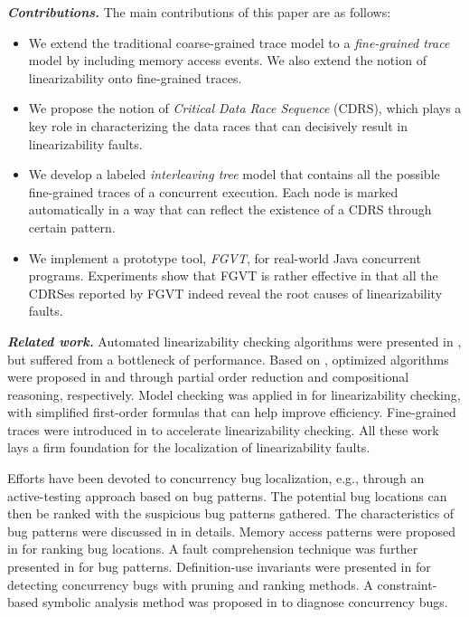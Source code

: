 \documentclass[runningheads]{llncs}
\begin{document}
\noindent\textbf{\textit{Contributions.}}
The main contributions of this paper are as follows:
\begin{itemize}
  \item We extend the traditional coarse-grained trace model to a \textit{fine-grained trace} model by including memory access events. We also extend the notion of linearizability onto fine-grained traces.
  \item We propose the notion of \textit{Critical Data Race Sequence} (CDRS), which plays a key role in characterizing the data races that can decisively result in linearizability faults.
  \item We develop a labeled \textit{interleaving tree} model that contains all the possible fine-grained traces of a concurrent execution. Each node is marked automatically in a way that can reflect the existence of a CDRS through certain pattern.
  \item We implement a prototype tool, \textit{FGVT}, for real-world Java concurrent programs. Experiments show that FGVT is rather effective in that all the CDRSes reported by FGVT indeed reveal the root causes of linearizability faults.
\end{itemize}

\noindent\textbf{\textit{Related work.}} Automated linearizability checking algorithms were presented in \cite{DBLP:conf/pldi/BurckhardtDMT10,DBLP:journals/jpdc/WingG93}, but suffered from a bottleneck of performance. Based on \cite{DBLP:journals/jpdc/WingG93}, optimized algorithms were proposed in \cite{DBLP:journals/concurrency/Lowe17} and \cite{DBLP:conf/forte/HornK15a} through partial order reduction and compositional reasoning, respectively. Model checking was applied in \cite{DBLP:conf/popl/BouajjaniEEH15,DBLP:conf/pldi/EmmiEH15} for linearizability checking, with simplified first-order formulas that can help improve efficiency. Fine-grained traces were introduced in \cite{DBLP:conf/sac/LongZ16} to accelerate linearizability checking. All these work lays a firm foundation for the localization of linearizability faults.

Efforts have been devoted to concurrency bug localization, e.g., through an active-testing approach based on bug patterns. The potential bug locations can then be ranked with the suspicious bug patterns gathered. The characteristics of bug patterns were discussed in \cite{DBLP:conf/asplos/LuPSZ08,DBLP:conf/ipps/FarchiNU03} in details. Memory access patterns were proposed in \cite{DBLP:conf/icse/ParkVH10,DBLP:conf/icst/ParkVH12,DBLP:conf/icsm/LiuQWM14} for ranking bug locations. A fault comprehension technique was further presented in \cite{DBLP:conf/icse/Park04} for bug patterns. Definition-use invariants were presented in \cite{DBLP:conf/oopsla/ShiPYLZCZ10} for detecting concurrency bugs with pruning and ranking methods. A constraint-based symbolic analysis method was proposed in \cite{DBLP:conf/issta/KhoshnoodKW15} to diagnose concurrency bugs.
\end{document}
